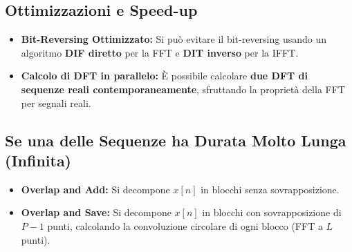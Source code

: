 \subsection*{Ottimizzazioni e Speed-up}

\begin{itemize}
    \item \textbf{Bit-Reversing Ottimizzato:} Si può evitare il bit-reversing usando un algoritmo \textbf{DIF diretto} per la FFT e \textbf{DIT inverso} per la IFFT.
    \item \textbf{Calcolo di DFT in parallelo:} È possibile calcolare \textbf{due DFT di sequenze reali contemporaneamente}, sfruttando la proprietà della FFT per segnali reali.
\end{itemize}

\subsection*{Se una delle Sequenze ha Durata Molto Lunga (Infinita)}

\begin{itemize}
    \item \textbf{Overlap and Add:} Si decompone \( x[n] \) in blocchi senza sovrapposizione.
    \item \textbf{Overlap and Save:} Si decompone \( x[n] \) in blocchi con sovrapposizione di \( P-1 \) punti, calcolando la convoluzione circolare di ogni blocco (FFT a \( L \) punti).
\end{itemize}


